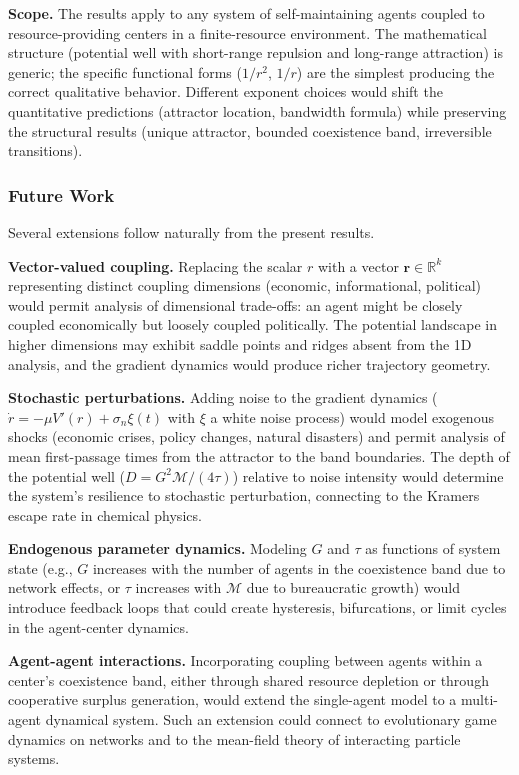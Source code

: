 \documentclass[11pt]{article}
\theoremstyle{plain}
\theoremstyle{definition}
\theoremstyle{remark}
\let\origsubsubsection\subsubsection
\renewcommand{\subsubsection}{\needspace{4\baselineskip}\origsubsubsection}
\begin{document}
\textbf{Scope.} The results apply to any system of self-maintaining
agents coupled to resource-providing centers in a finite-resource
environment. The mathematical structure (potential well with short-range
repulsion and long-range attraction) is generic; the specific functional
forms (\(1/r^2\), \(1/r\)) are the simplest producing the correct
qualitative behavior. Different exponent choices would shift the
quantitative predictions (attractor location, bandwidth formula) while
preserving the structural results (unique attractor, bounded coexistence
band, irreversible transitions).

\subsubsection{Future Work}\label{future-work-5}

Several extensions follow naturally from the present results.

\textbf{Vector-valued coupling.} Replacing the scalar \(r\) with a
vector \(\mathbf{r} \in \mathbb{R}^k\) representing distinct coupling
dimensions (economic, informational, political) would permit analysis of
dimensional trade-offs: an agent might be closely coupled economically
but loosely coupled politically. The potential landscape in higher
dimensions may exhibit saddle points and ridges absent from the 1D
analysis, and the gradient dynamics would produce richer trajectory
geometry.

\textbf{Stochastic perturbations.} Adding noise to the gradient dynamics
(\(\dot{r} = -\mu V'(r) + \sigma_n \xi(t)\) with \(\xi\) a white noise
process) would model exogenous shocks (economic crises, policy changes,
natural disasters) and permit analysis of mean first-passage times from
the attractor to the band boundaries. The depth of the potential well
(\(D = G^2\mathcal{M}/(4\tau)\)) relative to noise intensity would
determine the system's resilience to stochastic perturbation, connecting
to the Kramers escape rate in chemical physics.

\textbf{Endogenous parameter dynamics.} Modeling \(G\) and \(\tau\) as
functions of system state (e.g., \(G\) increases with the number of
agents in the coexistence band due to network effects, or \(\tau\)
increases with \(\mathcal{M}\) due to bureaucratic growth) would
introduce feedback loops that could create hysteresis, bifurcations, or
limit cycles in the agent-center dynamics.

\textbf{Agent-agent interactions.} Incorporating coupling between agents
within a center's coexistence band, either through shared resource
depletion or through cooperative surplus generation, would extend the
single-agent model to a multi-agent dynamical system. Such an extension
could connect to evolutionary game dynamics on networks and to the
mean-field theory of interacting particle systems.
\end{document}
